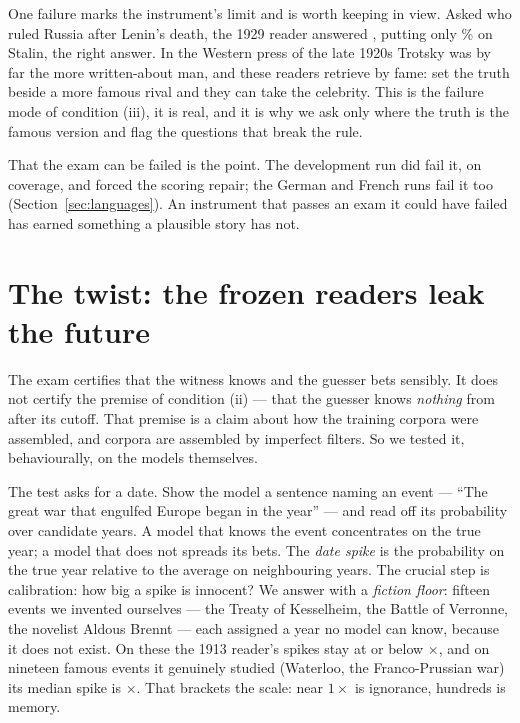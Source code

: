 \documentclass[11pt]{article}
\begin{document}
One failure marks the instrument's limit and is worth keeping in view. Asked who ruled Russia after Lenin's
death, the 1929 reader answered \NstalinNames{}, putting only \NstalinPost\% on Stalin, the right answer. In
the Western press of the late 1920s Trotsky was by far the more written-about man, and these readers
retrieve by fame: set the truth beside a more famous rival and they can take the celebrity. This is the
failure mode of condition (iii), it is real, and it is why we ask only where the truth is the famous
version and flag the questions that break the rule.

That the exam can be failed is the point. The development run did fail it, on coverage, and forced the
scoring repair; the German and French runs fail it too (Section~\ref{sec:languages}). An instrument that
passes an exam it could have failed has earned something a plausible story has not.

\section{The twist: the frozen readers leak the future}\label{sec:leak}

The exam certifies that the witness knows and the guesser bets sensibly. It does not certify the premise
of condition (ii) --- that the guesser knows \emph{nothing} from after its cutoff. That premise is a claim
about how the training corpora were assembled, and corpora are assembled by imperfect filters. So we
tested it, behaviourally, on the models themselves.

The test asks for a date. Show the model a sentence naming an event --- ``The great war that engulfed
Europe began in the year'' --- and read off its probability over candidate years. A model that knows the
event concentrates on the true year; a model that does not spreads its bets. The \emph{date spike} is the
probability on the true year relative to the average on neighbouring years. The crucial step is
calibration: how big a spike is innocent? We answer with a \emph{fiction floor}: fifteen events we
invented ourselves --- the Treaty of Kesselheim, the Battle of Verronne, the novelist Aldous Brennt ---
each assigned a year no model can know, because it does not exist. On these the 1913 reader's spikes stay
at or below \NspikeNullNinetyFifthThirteen$\times$, and on nineteen famous events it genuinely studied
(Waterloo, the Franco-Prussian war) its median spike is \NspikeKnownMedThirteen$\times$. That brackets the
scale: near $1\times$ is ignorance, hundreds is memory.
\end{document}
